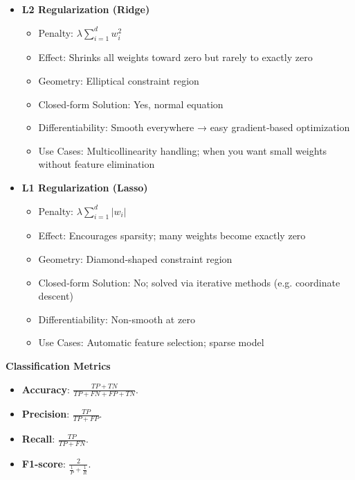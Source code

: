 \documentclass[8pt,twocolumn]{article}
\begin{document}
\begin{itemize}
    \setlength{\itemsep}{0pt}
    \setlength{\parskip}{0pt}
    \item \textbf{L2 Regularization (Ridge)}\vspace{-0.6em}
      \begin{itemize}
        \setlength{\itemsep}{0pt}
        \setlength{\parskip}{0pt}
        \item Penalty: \(\lambda \sum_{i=1}^d w_i^2\)
        \item Effect: Shrinks all weights toward zero but rarely to exactly zero
        \item Geometry: Elliptical constraint region
        \item Closed‐form Solution: Yes, normal equation
        \item Differentiability: Smooth everywhere → easy gradient‐based optimization
        \item Use Cases: Multicollinearity handling; when you want small weights without feature elimination
      \end{itemize}
    \item \textbf{L1 Regularization (Lasso)}\vspace{-0.6em}
      \begin{itemize}
        \setlength{\itemsep}{0pt}
        \setlength{\parskip}{0pt}
        \item Penalty: \(\lambda \sum_{i=1}^d |w_i|\)
        \item Effect: Encourages sparsity; many weights become exactly zero
        \item Geometry: Diamond-shaped constraint region
        \item Closed‐form Solution: No; solved via iterative methods (e.g. coordinate descent)
        \item Differentiability: Non-smooth at zero
        \item Use Cases: Automatic feature selection; sparse model
      \end{itemize}
  \end{itemize}\vspace{-0.6em}
\textbf{Classification Metrics}\vspace{-0.6em}
\begin{itemize}
    \setlength{\itemsep}{0pt}
    \setlength{\parskip}{0pt}
    \item \textbf{Accuracy}: $\frac{TP + TN}{TP + FN + FP + TN}$.
    \item \textbf{Precision}: $\frac{TP}{TP + FP}$.
    \item \textbf{Recall}: $\frac{TP}{TP + FN}$.
    \item \textbf{F1-score}: $\frac{2}{\frac{1}{P} + \frac{1}{R}}$.
\end{itemize}
\end{document}

